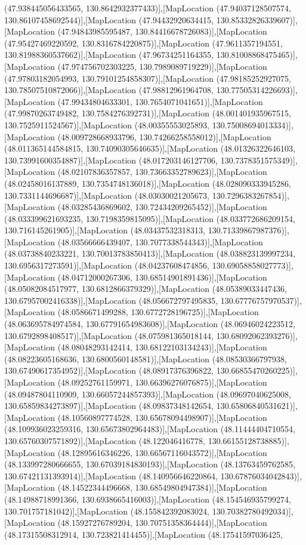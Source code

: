 (47.938445056433565, 130.8642932377433)],[MapLocation (47.94037128507574, 130.86107458692544)],[MapLocation (47.94432920634415, 130.85332826339607)],[MapLocation (47.94843985595487, 130.84416678726083)],[MapLocation (47.95427469220592, 130.8316784220875)],[MapLocation (47.9611357194551, 130.81988360537662)],[MapLocation (47.96734251164355, 130.81008868475465)],[MapLocation (47.974756702303225, 130.7989089719229)],[MapLocation (47.97803182054993, 130.79101254858307)],[MapLocation (47.98185252927075, 130.78507510872066)],[MapLocation (47.98812961964708, 130.77505314226693)],[MapLocation (47.99434804633301, 130.7654071041651)],[MapLocation (47.99870263749482, 130.7584276392731)],[MapLocation (48.001401935967515, 130.7525911524567)],[MapLocation (48.00355553025893, 130.75008694013334)],[MapLocation (48.009728668933796, 130.74266258558012)],[MapLocation (48.011365144584815, 130.74090305646635)],[MapLocation (48.01326322646103, 130.73991600354887)],[MapLocation (48.017203146127706, 130.7378351575349)],[MapLocation (48.02107836357857, 130.73663352789623)],[MapLocation (48.02458016137889, 130.7354748136018)],[MapLocation (48.028090333945286, 130.7331144696687)],[MapLocation (48.03030021205673, 130.7296383267854)],[MapLocation (48.03285436869602, 130.72434209265452)],[MapLocation (48.033399621693235, 130.7198359815095)],[MapLocation (48.033772686209154, 130.716145261905)],[MapLocation (48.03437532318313, 130.71339867987376)],[MapLocation (48.03566666439407, 130.7077338544343)],[MapLocation (48.03738840233221, 130.70013783850413)],[MapLocation (48.038823139997234, 130.6956317273591)],[MapLocation (48.04237608474856, 130.69058858027773)],[MapLocation (48.04712000267306, 130.68514901891436)],[MapLocation (48.05082084517977, 130.6812866379329)],[MapLocation (48.05389033447436, 130.67957002416338)],[MapLocation (48.056672797495835, 130.67776757970537)],[MapLocation (48.0586671499288, 130.6772728196725)],[MapLocation (48.063695784974584, 130.67791654983608)],[MapLocation (48.06946024223512, 130.6792898408517)],[MapLocation (48.075981365018144, 130.68092062393276)],[MapLocation (48.08048293142414, 130.68122103134243)],[MapLocation (48.08223605168636, 130.6800560148581)],[MapLocation (48.08530366797938, 130.67490617354952)],[MapLocation (48.08917376396822, 130.66855470260225)],[MapLocation (48.09252761159971, 130.66396276076875)],[MapLocation (48.09487804110909, 130.66057244857393)],[MapLocation (48.09697040625008, 130.65859834273897)],[MapLocation (48.09837348142654, 130.65806840531621)],[MapLocation (48.10560897774528, 130.65678094498907)],[MapLocation (48.109936023259316, 130.65673802964483)],[MapLocation (48.11444404710554, 130.65760307571892)],[MapLocation (48.122046416778, 130.66155128738885)],[MapLocation (48.12895616346226, 130.66567116043572)],[MapLocation (48.133997280666655, 130.67039184830193)],[MapLocation (48.13763459762585, 130.67421131393914)],[MapLocation (48.140956646220864, 130.67876034042843)],[MapLocation (48.14522344496668, 130.68549804947384)],[MapLocation (48.14988718991366, 130.6938665416003)],[MapLocation (48.154546935799274, 130.701757181042)],[MapLocation (48.155842392083024, 130.70382780492034)],[MapLocation (48.15927276789204, 130.70751358364444)],[MapLocation (48.17315508312914, 130.723821414455)],[MapLocation (48.17541597036425, 